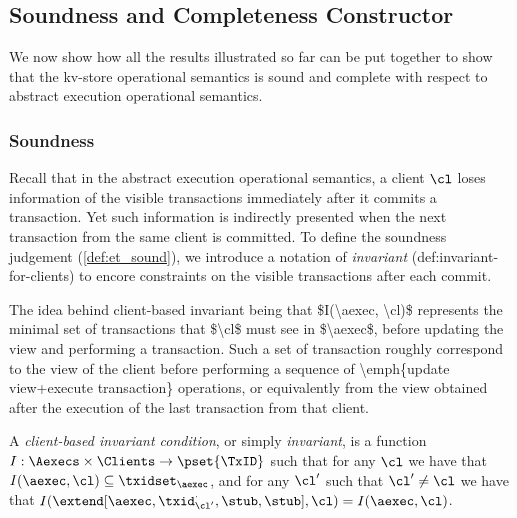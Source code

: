 \subsection{Soundness and Completeness Constructor}
\label{sec:kv2aexec-sound-complete}

We now show how all the results illustrated so far 
can be put together to show that the kv-store operational semantics 
is sound and complete with respect to abstract execution operational semantics.

\subsubsection{Soundness}
Recall that in the abstract execution operational semantics,
a client \( \cl \) loses information of the visible transactions immediately after it commits a transaction.
Yet such information is indirectly presented when the next transaction from the same client is committed.
To define the soundness judgement (\cref{def:et_sound}), we introduce a notation of \emph{invariant} ({def:invariant-for-clients})
to encore constraints on the visible transactions after each commit.

\ac{The idea behind client-based invariant being that $I(\aexec, \cl)$ represents 
the minimal set of transactions that $\cl$ must see in $\aexec$, before 
updating the view and performing a transaction. Such a set of transaction 
roughly correspond to the view of the client before performing a 
sequence of \emph{update view+execute transaction} operations, 
or equivalently from the view obtained after the execution of the 
last transaction from that client.}

\begin{definition}
\label{def:invariant-for-clients}
A \emph{client-based invariant condition}, or simply \emph{invariant}, is a 
function $I : \Aexecs \times \Clients \to \pset{\TxID}$ 
such that for any $\cl$ we have that $I(\aexec, \cl) \subseteq \txidset_{\aexec}$, and 
for any  $\cl'$ such that $\cl' \neq \cl$ we have that 
$I(\extend[\aexec, \txid_{\cl'}^{\cdot}, \stub, \stub], \cl) = I(\aexec, \cl)$.
\end{definition}



